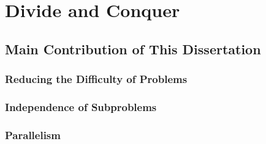 \section{Divide and Conquer}



\subsection{Main Contribution of This Dissertation}
\label{subsec:advantages}

\subsubsection{Reducing the Difficulty of Problems}

\subsubsection{Independence of Subproblems}

\subsubsection{Parallelism}


